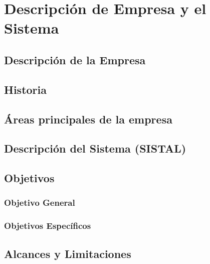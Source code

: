 \chapter{Descripción de Empresa y el Sistema}

\section{Descripción de la Empresa}

\section{Historia}

\section{Áreas principales de la empresa}

\section{Descripción del Sistema (SISTAL)}

\section{Objetivos}

\subsection{Objetivo General}

\subsection{Objetivos Específicos}

\section{Alcances y Limitaciones}


